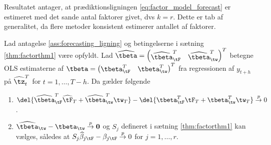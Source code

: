 Resultatet antager, at prædiktionsligningen \eqref{eq:factor_model_forecast} er estimeret med det sande antal faktorer givet, dvs \(k=r\).
Dette er tab af generalitet, da flere metoder konsistent estimerer antallet af faktorer.
%
\begin{thm} \label{thm:factorthm2}
Lad antagelse \ref{ass:forecasting_ligning} og betingelserne i sætning \ref{thm:factorthm1} være opfyldt. 
Lad \(\widehat{\tbeta} =\begin{pmatrix}
\widehat{\tbeta}_{\tF}^T & \widehat{\tbeta}_{\tw}^T
\end{pmatrix}^T\) betegne OLS estimaterne af  \(\tbeta =\begin{pmatrix}
\tbeta_{\tF}^T & \tbeta_{\tw}^T
\end{pmatrix}^T\) fra regressionen af \(y_{t+h}\) på \(\widehat{\tz}_t^T\) for \(t=1, \ldots, T-h\).
Da gælder følgende
\begin{enumerate}[label=\alph*)]
\item \(\del{\widehat{\tbeta}_{\tF}^T \widehat{\tF}_T + \widehat{\tbeta}^T_{\tw} \tw_T} - \del{\tbeta_{\tF}^T \tF_T + \tbeta_{\tw}^T \tw_T} \overset{p}{\rightarrow} 0\).
\item \(\widehat{\tbeta}_{\tw} - \tbeta_{\tw} \overset{p}{\rightarrow} \mathbf{0}\) og \(S_j\) defineret i sætning \ref{thm:factorthm1} kan vælges, således at \(S_j \widehat{\beta}_{j \tF} - \beta_{j \tF} \overset{p}{\rightarrow} 0\) for \(j = 1, \ldots, r\).
\end{enumerate}
\end{thm}
%
